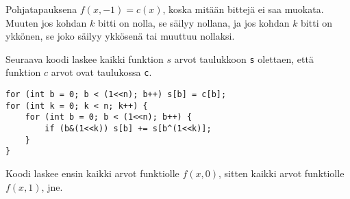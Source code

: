 Pohjatapauksena $f(x,-1)=c(x)$,
koska mitään bittejä ei saa muokata.
Muuten jos kohdan $k$ bitti on nolla,
se säilyy nollana, ja jos kohdan $k$ bitti on ykkönen,
se joko säilyy ykkösenä tai muuttuu nollaksi.

Seuraava koodi laskee kaikki funktion $s$ arvot taulukkoon
\texttt{s} olettaen, että funktion $c$ arvot ovat
taulukossa \texttt{c}.
\begin{lstlisting}
for (int b = 0; b < (1<<n); b++) s[b] = c[b];
for (int k = 0; k < n; k++) {
    for (int b = 0; b < (1<<n); b++) {
        if (b&(1<<k)) s[b] += s[b^(1<<k)];
    }
}
\end{lstlisting}
Koodi laskee ensin kaikki arvot funktiolle $f(x,0)$,
sitten kaikki arvot funktiolle $f(x,1)$, jne.